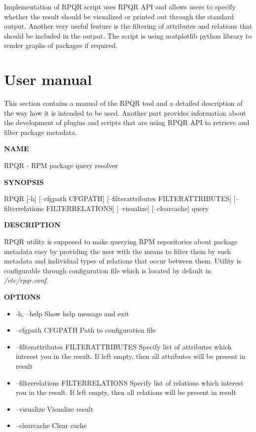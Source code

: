 Implementation of RPQR script uses RPQR API and allows users to specify whether the result should be
visualized or printed out through the standard output. Another very useful feature is the filtering of
attributes and relations that should be included in the output. The script is using matplotlib python
library to render graphs of packages if required.

\section{User manual}
This section contains a manual of the RPQR tool and a detailed description of the way how it is intended to be
used. Another part provides information about the development of plugins and scripts that are using RPQR
API to retrieve and filter package metadata.

\textbf{NAME}

RPQR - RPM package query resolver

\textbf{SYNOPSIS}

RPQR [-h] [--cfgpath CFGPATH] [--filterattributes FILTERATTRIBUTES] [--filterrelations FILTERRELATIONS]
[--visualize] [--clearcache]
query

\textbf{DESCRIPTION}

RPQR utility is supposed to make querying RPM repositories about package metadata easy by providing
the user with the means to filter them by such metadata and individual types of relations that occur between
them. Utility is configurable through configuration file which is located by default in \textit{/etc/rpqr.conf}.

\textbf{OPTIONS}

\begin{itemize}
  \item -h, --help
    \subitem Show help message and exit
  \item --cfgpath CFGPATH
    \subitem Path to configuration file
  \item --filterattributes FILTERATTRIBUTES
    \subitem Specify list of attributes which interest you in the result. If left empty, then all attributes will be present in result
  \item --filterrelations FILTERRELATIONS
    \subitem Specify list of relations which interest you in the result. If left empty, then all relations will be present in result
  \item --visualize
    \subitem Visualize result
  \item --clearcache
    \subitem Clear cache
\end{itemize}

